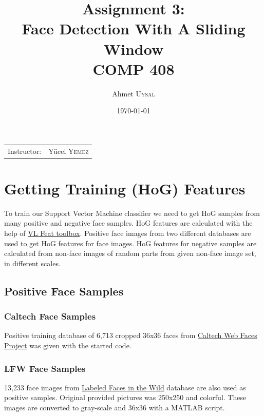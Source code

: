 \documentclass{article}
\title{Assignment 3: \\ Face Detection With A Sliding Window\\ COMP 408} %
\author{Ahmet \textsc{Uysal}} %
\date{\today} %
\begin{document}
\maketitle %

\begin{center}
\begin{tabular}{l r}
Instructor: & Y\"ucel  \textsc{Yemez} %
\end{tabular}
\end{center}



\section{Getting Training (HoG) Features}	

To train our Support Vector Machine classifier we need to get HoG samples from many positive and negative face samples. HoG features are calculated with the help of \href{http://www.vlfeat.org/matlab/matlab.html}{VL Feat toolbox}. Positive face images from two different databases are used to get HoG features for face images. HoG features for negative samples are calculated from non-face images of random parts from given non-face image set, in different scales.

\subsection{Positive Face Samples}

\subsubsection{Caltech Face Samples}
 Positive training database of 6,713 cropped 36x36 faces from \href{http://www.vision.caltech.edu/Image_Datasets/Caltech_10K_WebFaces/}{Caltech Web Faces Project} was given with the started code.

\subsubsection{LFW Face Samples}
13,233 face images from  \href{http://vis-www.cs.umass.edu/lfw/}{Labeled Faces in the Wild} database are also used as positive samples. Original provided pictures was 250x250 and colorful. These images are converted to gray-scale and 36x36 with a MATLAB script.
\end{document}
